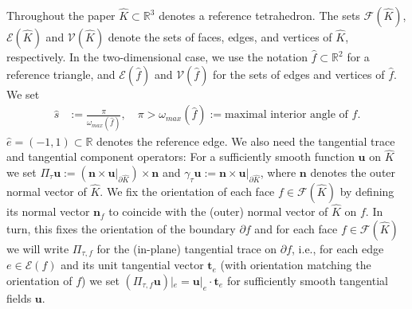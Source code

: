 \documentclass{article}
\begin{document}
\label{sec:thm:projection-based-interpolation}
Throughout the paper $\widehat{K} \subset {\mathbb R}^3$ denotes a reference tetrahedron.
The sets $\mathcal{F}(\widehat{K})$, $\mathcal{E}(\widehat{K})$ and $\mathcal{V}(\widehat{K})$ denote 
the sets of faces, edges, and vertices of $\widehat{K}$, respectively. In the two-dimensional case, 
we use the notation $\widehat{f}\subset {\mathbb R}^2$ for a reference triangle, and $\mathcal{E}(\widehat{f})$ 
and $\mathcal{V}(\widehat{f})$ for the sets of edges and vertices of $\widehat{f}$. We set
\begin{align}
\label{eq:maximal-angle}
\widehat{s}&:=\frac{\pi}{\omega_{max}(\widehat f)}, \quad \pi > \omega_{max}(\widehat f):=\text{maximal interior angle of } \widehat{f}. 
\end{align}
$\widehat{e} = (-1,1) \subset \mathbb{R}$ denotes the reference edge.
We also need the tangential trace and tangential component operators: 
For a sufficiently smooth 
function ${\mathbf u}$ on $\widehat K$ we set 
$\Pi_{\tau} {\mathbf u} := ({\mathbf n} \times {\mathbf u}|_{\partial \widehat K}) \times {\mathbf n}$ and 
$\gamma_\tau {\mathbf u} := {\mathbf n} \times {\mathbf u}|_{\partial\widehat K}$, 
where ${\mathbf n}$ denotes the outer normal
vector of $\widehat K$. We fix the orientation of each face 
$f \in {\mathcal F}(\widehat K)$ by defining its normal vector ${\mathbf n}_f$ to coincide with 
the (outer) normal vector of $\widehat K$ on $f$. In turn, this fixes the orientation of 
the boundary $\partial f$ and for each face 
$f \in {\mathcal F}(\widehat K)$ we will write 
$\Pi_{\tau,f}$ for the (in-plane) tangential trace on $\partial f$, i.e., for each edge 
$e \in {\mathcal E}(f)$ and its unit tangential vector ${\mathbf t}_e$ (with orientation matching the orientation
of $f$) we set $(\Pi_{\tau,f} {\mathbf u})|_{e} =  {\mathbf u}|_e \cdot {\mathbf t}_e$
for sufficiently smooth tangential fields ${\mathbf u}$.
\end{document}
